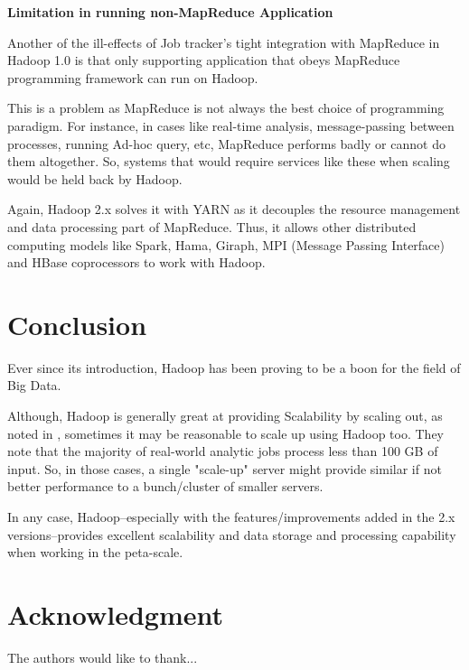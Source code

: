 \documentclass[conference]{IEEEtran}
\begin{document}
\textbf{Limitation in running non-MapReduce Application}

Another of the ill-effects of Job tracker’s tight integration with MapReduce in Hadoop 1.0 is that only supporting application 
that obeys MapReduce programming framework can run on Hadoop. 

This is a problem as MapReduce is not always the best choice of programming paradigm. 
For instance, in cases like real-time analysis, message-passing between processes, running Ad-hoc query, etc, 
MapReduce performs badly or cannot do them altogether. So, systems that would require services like these when scaling 
would be held back by Hadoop. 

Again, Hadoop 2.x solves it with YARN as it decouples the resource management and data processing part of MapReduce. 
Thus, it allows other distributed computing models like Spark, Hama, Giraph, MPI (Message Passing Interface) and HBase 
coprocessors to work with Hadoop. 


\section{Conclusion}

Ever since its introduction, Hadoop has been proving to be a boon for the field of Big Data. 

Although, Hadoop is generally great at providing Scalability by scaling out, as noted in \cite{Appuswamy2013}, sometimes it may be 
reasonable to scale up using Hadoop too. They note that the majority of real-world analytic jobs process less than 100 GB of input. 
So, in those cases, a single "scale-up" server might provide similar if not better performance to a bunch/cluster of smaller servers.

In any case, Hadoop--especially with the features/improvements added in the 2.x versions--provides excellent scalability and data storage and processing
capability when working in the peta-scale.




\appendices
\section*{Acknowledgment}

The authors would like to thank...


\ifCLASSOPTIONcaptionsoff
  \newpage
\fi
\end{document}
